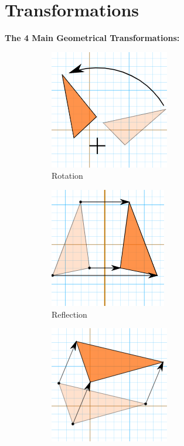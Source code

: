 \section{Transformations}
    \color{purple} \textbf{The 4 Main Geometrical Transformations:} \color{black} \\

    \begin{figure} [hbt!]
        \centering
        \begin{subfigure}[b]{.45\linewidth}
            \includegraphics[scale=0.5]{Resources/Unit5Transformations/rotation.PNG}
            \caption*{Rotation}
        \end{subfigure}
        \begin{subfigure}[b]{.45\linewidth}
            \includegraphics[scale=0.5]{Resources/Unit5Transformations/reflection.PNG}
            \caption*{Reflection}
        \end{subfigure}
        \begin{subfigure}[b]{.45\linewidth}
            \includegraphics[scale=0.5]{Resources/Unit5Transformations/translation.PNG}

\end{subfigure}
\end{figure}
